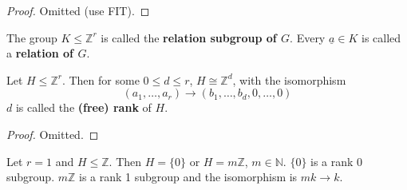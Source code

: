 \begin{proof}
	Omitted (use FIT).
\end{proof}

\begin{definition}
	The group $K \le \mathbb{Z}^r$ is called the \textbf{relation subgroup of $G$}. Every $\underline{a} \in K$ is called a \textbf{relation of $G$}.
\end{definition}

\begin{proposition}\label{prop:rank}
	Let $H \le \mathbb{Z}^r$. Then for some $0 \le d \le r$, $H \cong \mathbb{Z}^d$, with the isomorphism
	\[
		(a_1, \dots, a_r) \to (b_1, \dots, b_d, 0, \dots, 0)
	\]
	$d$ is called the \textbf{(free) rank} of $H$.
\end{proposition}

\begin{proof}
	Omitted.
\end{proof}

\begin{example}
	Let $r = 1$ and $H \le \mathbb{Z}$. Then $H = \{ 0 \}$ or $H = m \mathbb{Z}$, $m \in \mathbb{N}$. $\{ 0 \}$ is a rank 0 subgroup. $m \mathbb{Z}$ is a rank 1 subgroup and the isomorphism is $mk \to k$.
\end{example}

